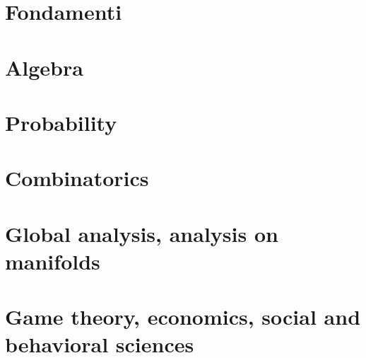 \documentclass[a4paper,10pt]{book}
\begin{document}
  \tableofcontents
	
  
  
  
  \part{Fondamenti}
  
  \part{Algebra}
  

  \part{Probability}
  
  
  \part{Combinatorics}
  
  
  \part{Global analysis, analysis on manifolds}  
  
  
  \part{Game theory, economics, social and behavioral sciences}
  
  
 
  \cleardoublepage

  
\end{document}
